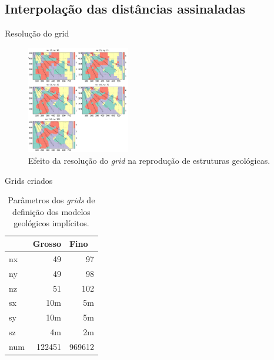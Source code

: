 \documentclass[aspectratio=169]{beamer}
\begin{document}
\subsection{Interpolação das distâncias assinaladas}

\begin{frame}{Resolução do grid}

\begin{figure}[H]
	\caption{\label{grid_res}Efeito da resolução do \textit{grid} na reprodução de estruturas geológicas.}
	\begin{center}
		\includegraphics[width=0.4\textwidth]{capitulo_2/grid_res.png}
	\end{center}
\end{figure}

\end{frame}

\begin{frame}{Grids criados}
	\begin{table}[H]
		\centering
		\begin{tabular}{lrr}
			& \multicolumn{1}{l}{Grosso} & \multicolumn{1}{l}{Fino} \\ \hline
			nx & 49 & 97 \\
			ny & 49 & 98 \\
			nz & 51 & 102 \\
			sx & 10m & 5m \\
			sy & 10m & 5m \\
			sz & 4m & 2m \\
			num & 122451 & 969612 \\ \hline
		\end{tabular}
		\caption{Parâmetros dos \textit{grids} de definição dos modelos geológicos implícitos.} \label{grid_def}
	\end{table}
\end{frame}
\end{document}

